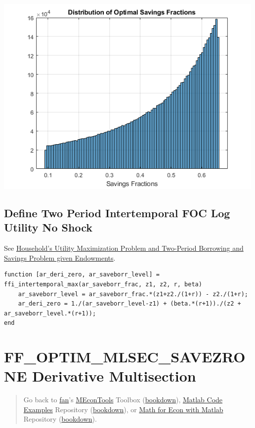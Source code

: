 \documentclass[
]{book}
\begin{document}
\includegraphics[width=5.20833in,height=\textheight]{img/fx_optim_bisec_savezrone_images/figure_3.png}

\hypertarget{define-two-period-intertemporal-foc-log-utility-no-shock}{%
\subsection{Define Two Period Intertemporal FOC Log Utility No Shock}\label{define-two-period-intertemporal-foc-log-utility-no-shock}}

See \href{https://fanwangecon.github.io/Math4Econ/derivative_application/htmlpdfm/K_save_households.html}{Household's Utility Maximization Problem and Two-Period Borrowing
and Savings Problem given
Endowments}.

\begin{verbatim}
function [ar_deri_zero, ar_saveborr_level] = ffi_intertemporal_max(ar_saveborr_frac, z1, z2, r, beta)
    ar_saveborr_level = ar_saveborr_frac.*(z1+z2./(1+r)) - z2./(1+r);
    ar_deri_zero = 1./(ar_saveborr_level-z1) + (beta.*(r+1))./(z2 + ar_saveborr_level.*(r+1));
end
\end{verbatim}

\hypertarget{ff_optim_mlsec_savezrone-derivative-multisection}{%
\section{FF\_OPTIM\_MLSEC\_SAVEZRONE Derivative Multisection}\label{ff_optim_mlsec_savezrone-derivative-multisection}}

\begin{quote}
Go back to \href{http://fanwangecon.github.io/}{fan}'s \href{https://fanwangecon.github.io/MEconTools/}{MEconTools} Toolbox (\href{https://fanwangecon.github.io/MEconTools/bookdown}{bookdown}), \href{https://fanwangecon.github.io/M4Econ/}{Matlab Code Examples} Repository (\href{https://fanwangecon.github.io/M4Econ/bookdown}{bookdown}), or \href{https://fanwangecon.github.io/Math4Econ/}{Math for Econ with Matlab} Repository (\href{https://fanwangecon.github.io/Math4Econ/bookdown}{bookdown}).
\end{quote}
\end{document}
